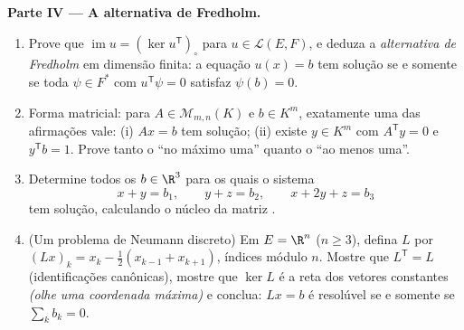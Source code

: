 \begin{problem}
\medskip
\noindent\textbf{Parte IV --- A alternativa de Fredholm.}
\begin{enumerate}[resume]
  \item Prove que $\operatorname{im} u = (\ker u^{\mathsf
        T})_\circ$ para $u \in \mathcal{L}(E, F)$, e deduza a
        \emph{alternativa de Fredholm} em dimensão finita: a
        equação $u(x) = b$ tem solução se e somente se toda
        $\psi \in F^*$ com $u^{\mathsf T}\psi = 0$ satisfaz
        $\psi(b) = 0$.
  \item Forma matricial: para $A \in \mathcal{M}_{m,n}(K)$ e $b \in
        K^m$, exatamente uma das afirmações vale: (i) $Ax = b$
        tem solução; (ii) existe $y \in K^m$ com
        $A^{\mathsf T}y = 0$ e $y^{\mathsf T}b = 1$. Prove tanto
        o ``no máximo uma'' quanto o ``ao menos uma''.
  \item Determine todos os $b \in \R^3$ para os quais o sistema
        \[
        x + y = b_1, \qquad y + z = b_2, \qquad x + 2y + z = b_3
        \]
        tem solução, calculando o núcleo da matriz
        .
  \item (Um problema de Neumann discreto) Em $E = \R^n$ ($n \geq 3$),
        defina $L$ por $(Lx)_k = x_k - \frac12(x_{k-1} +
        x_{k+1})$, índices módulo $n$. Mostre que $L^{\mathsf T} = L$
        (identificações canônicas), mostre que $\ker L$ é a reta dos
        vetores constantes \emph{(olhe uma coordenada máxima)}
        e conclua: $Lx = b$ é resolúvel se e somente se $\sum_k b_k = 0$.
\end{enumerate}


\end{problem}
